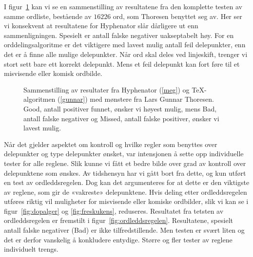 I figur~\ref{fig:results} kan vi se en sammenstilling av resultatene fra den komplette testen av samme ordliste, bestående av $16226$ ord, som Thoresen benyttet seg av. Her ser vi konsekvent at resultatene for Hyphenator slår dårligere ut enn sammenligningen. Spesielt er antall falske negativer uakseptabelt høy. For en orddelingsalgoritme er det viktigere med lavest mulig antall feil delepunkter, enn det er å finne alle mulige delepunkter. Når ord skal deles ved linjeskift, trenger vi stort sett bare ett korrekt delepunkt. Mens et feil delepunkt kan fort føre til et misvisende eller komisk ordbilde.

\begin{figure}[h]
	
  \caption[Sammenstilling av resultater fra \TeX{} og Hyphenator]{Sammenstilling av resultater fra Hyphenator (\ref{meg}) og \TeX{}-algoritmen (\ref{gunnar}) med mønstere fra Lars Gunnar Thoresen. Good, antall positiver funnet, ønsker vi høyest mulig, mens Bad, antall falske negativer og Missed, antall falske positiver, ønsker vi lavest mulig.}
  \label{fig:results}
\end{figure}

Når det gjelder aspektet om kontroll og hvilke regler som benyttes over delepunkter og type delepunkter ønsket, var intensjonen å sette opp individuelle tester for alle reglene. Slik kunne vi fått et bedre bilde over grad av kontroll over delepunktene som ønskes. Av tidshensyn har vi gått bort fra dette, og kun utført en test av ordleddsregelen. Dog kan det argumenteres for at dette er den viktigste av reglene, som gir de «vakreste» delepunktene. Hvis deling etter ordleddsregelen utføres riktig vil muligheter for misvisende eller komiske ordbilder, slik vi kan se i figur~\ref{fig:dopalger} og \ref{fig:freskukens}, reduseres. Resultatet fra tetsten av ordleddsregelen er fremstilt i figur~\ref{fig:ordleddsregelen}. Resultatene, spesielt antall falske negativer (Bad) er ikke tilfredstillende. Men testen er svært liten og det er derfor vanskelig å konkludere entydige. Større og fler tester av reglene individuelt trengs.


